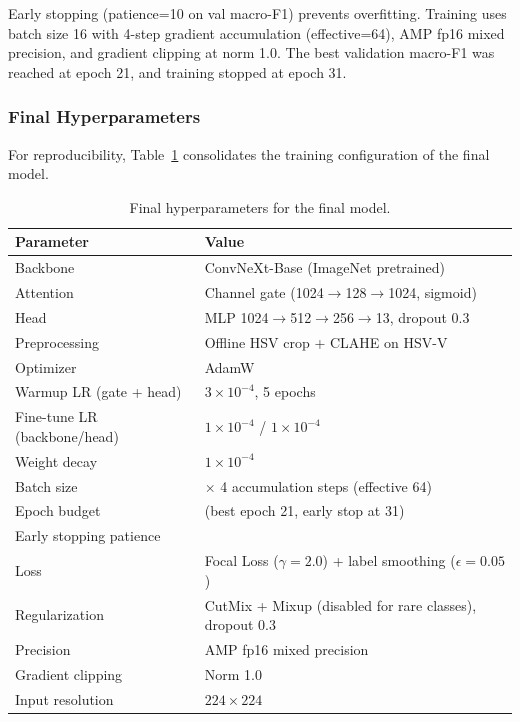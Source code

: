\documentclass[twocolumn,a4paper]{article}
\begin{document}
Early stopping (patience=10 on val macro-F1) prevents overfitting. Training uses batch size 16 with 4-step gradient accumulation (effective=64), AMP fp16 mixed precision, and gradient clipping at norm 1.0. The best validation macro-F1 was reached at epoch 21, and training stopped at epoch 31.

\subsubsection{Final Hyperparameters}

For reproducibility, Table~\ref{tab:hparams} consolidates the training configuration of the final model.

\begin{table}[htbp]
\centering
\caption{Final hyperparameters for the final model.}
\label{tab:hparams}
\footnotesize
\setlength{\tabcolsep}{4pt}
\begin{tabular}{@{}>{\raggedright\arraybackslash}p{2.5cm}>{\raggedright\arraybackslash}p{5.5cm}@{}}
\toprule
\textbf{Parameter} & \textbf{Value} \\
\midrule
Backbone & ConvNeXt-Base (ImageNet pretrained) \\
Attention & Channel gate (1024$\to$128$\to$1024, sigmoid) \\
Head & MLP 1024$\to$512$\to$256$\to$13, dropout 0.3 \\
Preprocessing & Offline HSV crop + CLAHE on HSV-V \\
Optimizer & AdamW \\
Warmup LR (gate + head) & $3\times10^{-4}$, 5 epochs \\
Fine-tune LR (backbone/head) & $1\times10^{-4}$ / $1\times10^{-4}$ \\
Weight decay & $1\times10^{-4}$ \\
Batch size & 16 $\times$ 4 accumulation steps (effective 64) \\
Epoch budget & 60 (best epoch 21, early stop at 31) \\
Early stopping patience & 10 \\
Loss & Focal Loss ($\gamma=2.0$) + label smoothing ($\epsilon=0.05$) \\
Regularization & CutMix + Mixup (disabled for rare classes), dropout 0.3 \\
Precision & AMP fp16 mixed precision \\
Gradient clipping & Norm 1.0 \\
Input resolution & $224\times224$ \\
\bottomrule
\end{tabular}
\end{table}
\end{document}
